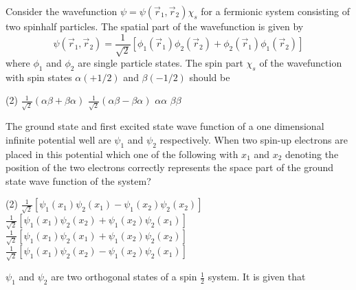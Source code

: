 \begin{enumerate}
\begin{minipage}{\textwidth}
	\item Consider the wavefunction $\psi=\psi\left(\vec{r}_{1}, \vec{r}_{2}\right) \chi_{s}$ for a fermionic system consisting of two spinhalf particles. The spatial part of the wavefunction is given by
	$$
	\psi\left(\vec{r}_{1}, \vec{r}_{2}\right)=\frac{1}{\sqrt{2}}\left[\phi_{1}\left(\vec{r}_{1}\right) \phi_{2}\left(\vec{r}_{2}\right)+\phi_{2}\left(\vec{r}_{1}\right) \phi_{1}\left(\vec{r}_{2}\right)\right]
	$$
	where $\phi_{1}$ and $\phi_{2}$ are single particle states. The spin part $\chi_{s}$ of the wavefunction with spin states $\alpha(+1 / 2)$ and $\beta(-1 / 2)$ should be
\end{minipage}
\begin{tasks}(2)
	\task[\textbf{A.}]$\frac{1}{\sqrt{2}}(\alpha \beta+\beta \alpha)$
	\task[\textbf{B.}]$\frac{1}{\sqrt{2}}(\alpha \beta-\beta \alpha)$
	\task[\textbf{C.}]$\alpha \alpha$
	\task[\textbf{D.}] $\beta \beta$
\end{tasks}
\begin{minipage}{\textwidth}
	\item The ground state and first excited state wave function of a one dimensional infinite potential well are $\psi_{1}$ and $\psi_{2}$ respectively. When two spin-up electrons are placed in this potential which one of the following with $x_{1}$ and $x_{2}$ denoting the position of the two electrons correctly represents the space part of the ground state wave function of the system?
\end{minipage}
\begin{tasks}(2)
	\task[\textbf{A.}] $\frac{1}{\sqrt{2}}\left[\psi_{1}\left(x_{1}\right) \psi_{2}\left(x_{1}\right)-\psi_{1}\left(x_{2}\right) \psi_{2}\left(x_{2}\right)\right]$
	\task[\textbf{B.}]$\frac{1}{\sqrt{2}}\left[\psi_{1}\left(x_{1}\right) \psi_{2}\left(x_{2}\right)+\psi_{1}\left(x_{2}\right) \psi_{2}\left(x_{1}\right)\right]$
	\task[\textbf{C.}]$\frac{1}{\sqrt{2}}\left[\psi_{1}\left(x_{1}\right) \psi_{2}\left(x_{1}\right)+\psi_{1}\left(x_{2}\right) \psi_{2}\left(x_{2}\right)\right]$
	\task[\textbf{D.}]$ \frac{1}{\sqrt{2}}\left[\psi_{1}\left(x_{1}\right) \psi_{2}\left(x_{2}\right)-\psi_{1}\left(x_{2}\right) \psi_{2}\left(x_{1}\right)\right]$
\end{tasks}
\begin{minipage}{\textwidth}
	\item $\psi_{1}$ and $\psi_{2}$ are two orthogonal states of a spin $\frac{1}{2}$ system. It is given that

\end{minipage}
\end{enumerate}
